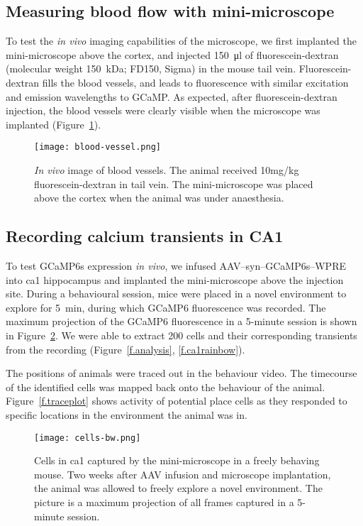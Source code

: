 \subsection{Measuring blood flow with mini-microscope}
To test the \textit{in vivo} imaging capabilities of the microscope, we first implanted the mini-microscope above the cortex, and injected \SI{150}{\ul} of fluorescein-dextran (molecular weight \SI{150}{\kilo\dalton}; FD150, Sigma) in the mouse tail vein. Fluorescein-dextran fills the blood vessels, and leads to fluorescence with similar excitation and emission wavelengths to GCaMP. As expected, after fluorescein-dextran injection, the blood vessels were clearly visible when the microscope was implanted (Figure~\ref{f.bloodvessel}).
\begin{figure}[h]
    \texttt{[image: blood-vessel.png]}
    \caption[\textit{In vivo} image of blood vessels.]{\textit{In vivo} image of blood vessels. The animal received 10mg/kg fluorescein-dextran in tail vein. The mini-microscope was placed above the cortex when the animal was under anaesthesia. \label{f.bloodvessel}}
\end{figure}


\subsection{Recording calcium transients in CA1}
To test GCaMP6s expression \textit{in vivo}, we infused AAV--syn--GCaMP6s--WPRE into \gls{ca1} hippocampus and implanted the mini-microscope above the injection site. During a behavioural session,  mice were placed in a novel environment to explore for \SI{5}{\minute}, during which GCaMP6 fluorescence was recorded. The maximum projection of the GCaMP6 fluorescence in a 5-minute session is shown in Figure~\ref{f.ca1bw}. We were able to extract 200 cells and their corresponding  transients from the recording (Figure~\ref{f.analysis}, \ref{f.ca1rainbow}).

The positions of animals were traced out in the behaviour video. The timecourse of the identified cells was mapped back onto the behaviour of the animal. Figure~\ref{f.traceplot} shows  activity of potential place cells as they responded to specific locations in the environment the animal was in.
\begin{figure}[h]
    \texttt{[image: cells-bw.png]}
    \caption[Image of \Gls{ca1} neurons in a freely behaving mouse.]{Cells in \gls{ca1} captured by the mini-microscope in a freely behaving mouse. Two weeks after AAV infusion and microscope implantation, the animal was allowed to freely explore a novel environment. The picture is a maximum projection of all frames captured in a 5-minute session. \label{f.ca1bw}}
\end{figure}


